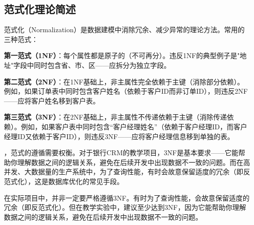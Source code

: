 \subsection{范式化理论简述}

范式化（Normalization）是数据建模中消除冗余、减少异常的理论方法。常用的三种范式：

\textbf{第一范式（1NF）}：每个属性都是原子的（不可再分）。违反1NF的典型例子是"地址"字段中同时包含省、市、区——应拆分为独立字段。

\textbf{第二范式（2NF）}：在1NF基础上，非主属性完全依赖于主键（消除部分依赖）。例如，如果订单表中同时包含客户姓名（依赖于客户ID而非订单ID），则违反2NF——应将客户姓名移到客户表。

\textbf{第三范式（3NF）}：在2NF基础上，非主属性不传递依赖于主键（消除传递依赖）。例如，如果客户表中同时包含“客户经理姓名”（依赖于客户经理ID，而客户经理ID又依赖于客户ID），则违反3NF——应将客户经理信息移到单独的表。\par\n{}，范式的遵循需要权衡。对于银行CRM的教学项目，3NF是基本要求——它能帮助你理解数据之间的逻辑关系，避免在后续开发中出现数据不一致的问题。而在高并发、大数据量的生产系统中，为了查询性能，有时会故意保留适度的冗余（即反范式化），这是数据库优化的常见手段。

\begin{notebox}[范式化的实践取舍]
在实际项目中，并非一定要严格遵循3NF。有时为了查询性能，会故意保留适度的冗余（即反范式化）。但在教学实验中，建议至少达到3NF，因为它能帮助你理解数据之间的逻辑关系，避免在后续开发中出现数据不一致的问题。
\end{notebox}

